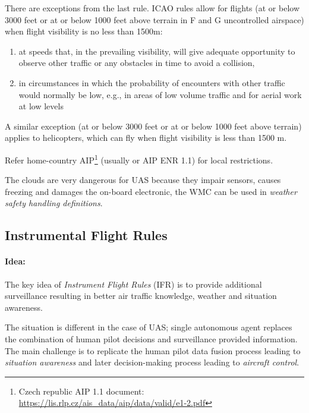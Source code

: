 \noindent There are exceptions from the last rule. ICAO rules allow for flights (at or below 3000 feet or at or below 1000 feet above terrain in F and G uncontrolled airspace) when flight visibility is no less than 1500m:
\begin{enumerate}
    \item at speeds that, in the prevailing visibility, will give adequate opportunity to observe other traffic or any obstacles in time to avoid a collision,
    
    \item in circumstances in which the probability of encounters with other traffic would normally be low, e.g., in areas of low volume traffic and for aerial work at low levels
\end{enumerate}

\noindent A similar exception (at or below 3000 feet or at or below 1000 feet above terrain) applies to helicopters, which can fly when flight visibility is less than 1500 m.

\begin{note}
	Refer home-country AIP\footnote{Czech republic AIP 1.1 document: \url{https://lis.rlp.cz/ais_data/aip/data/valid/e1-2.pdf}} (usually  or AIP ENR 1.1) for local restrictions.
\end{note}
\begin{note}
    The clouds are very dangerous for UAS because they impair sensors, causes freezing and damages the on-board electronic, the WMC can be used in \emph{weather safety handling definitions}.
\end{note}

\subsection{Instrumental Flight Rules}\label{sec:InstrumentalFlightRules}
\paragraph{Idea:} The key idea of \emph{Instrument Flight Rules} (IFR) is to provide additional surveillance resulting in better air traffic knowledge, weather and situation awareness. 

The situation is different in the case of UAS; single autonomous agent replaces the combination of human pilot decisions and surveillance provided information. The main challenge is to replicate the human pilot data fusion process leading to \emph{situation awareness} and later decision-making process leading to \emph{aircraft control}.

